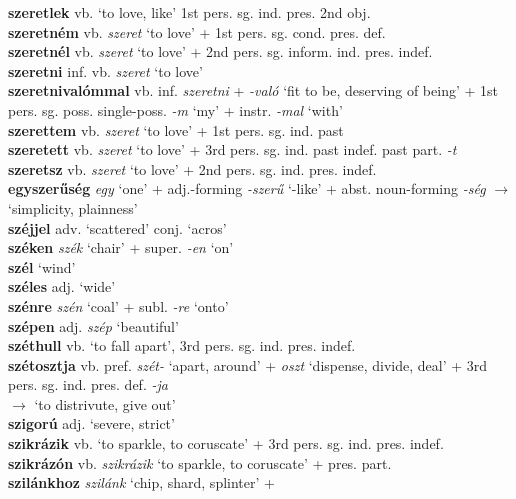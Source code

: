 \documentclass[11pt]{article}
\begin{document}
\textbf{szeretlek} vb. `to love, like' 1st pers. sg. ind. pres. 2nd
obj. \\
\textbf{szeretném} vb. \emph{szeret} `to love' + 1st
pers. sg. cond. pres. def. \\
\textbf{szeretnél} vb. \emph{szeret} `to love' + 2nd
pers. sg. inform. ind. pres. indef. \\
\textbf{szeretni} inf. vb. \emph{szeret} `to love' \\
\textbf{szeretnivalómmal} vb. inf. \emph{szeretni} + \emph{-való} `fit
to be, deserving of being' + 1st
pers. sg. poss. single\hyp{}poss. \emph{-m} `my' + instr. \emph{-mal} `with' \\
\textbf{szerettem} vb. \emph{szeret} `to love' + 1st
pers. sg. ind. past \\
\textbf{szeretett} vb. \emph{szeret} `to love' + 3rd
pers. sg. ind. past indef. \textbar\textbar{} past part. \emph{-t} \\
\textbf{szeretsz} vb. \emph{szeret} `to love' + 2nd
pers. sg. ind. pres. indef. \\
\textbf{egyszerűség} \emph{egy} `one' +
adj.\hyp{}forming \emph{-szerű} `-like' + abst. noun\hyp{}forming
  \emph{-ség} $\rightarrow$ `simplicity, plainness' \\
\textbf{széjjel} adv. `scattered' \textbar\textbar{} conj. `acros' \\
\textbf{széken} \emph{szék} `chair' + super. \emph{-en} `on' \\
\textbf{szél} `wind' \\
\textbf{széles} adj. `wide' \\
\textbf{szénre} \emph{szén} `coal' + subl. \emph{-re} `onto' \\
\textbf{szépen} adj. \emph{szép} `beautiful' \\
\textbf{széthull} vb. `to fall apart', 3rd
pers. sg. ind. pres. indef. \\
\textbf{szétosztja} vb. pref. \emph{szét-} `apart, around'
+ \emph{oszt} `dispense, divide, deal' + 3rd
pers. sg. ind. pres. def. \emph{-ja} \\
$\rightarrow$ `to distrivute, give out' \\
\textbf{szigorú} adj. `severe, strict' \\
\textbf{szikrázik} vb. `to sparkle, to coruscate' + 3rd
pers. sg. ind. pres. indef. \\
\textbf{szikrázón} vb. \emph{szikrázik} `to sparkle, to coruscate' +
pres. part. \\
\textbf{szilánkhoz} \emph{szilánk} `chip, shard, splinter' +
\end{document}
